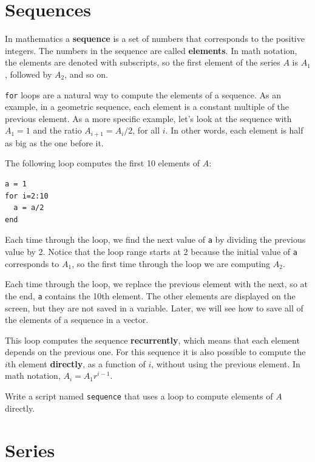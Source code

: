 \documentclass{book}
\begin{document}
\section{Sequences}

In mathematics a {\bf sequence} is a set of numbers that corresponds
to the positive integers. The numbers in the sequence are
called {\bf elements}. In math notation, the elements
are denoted with subscripts, so the first element of the series $A$ is
$A_1$, followed by $A_2$, and so on.

{\tt for} loops are a natural way to compute the elements of a sequence.
As an example, in a geometric sequence, each element is a constant
multiple of the previous element. As a more specific example, let's
look at the sequence with $A_1 = 1$ and the ratio $A_{i+1} = A_i/2$,
for all $i$. In other words, each element is half as big as the one
before it.

The following loop computes the first 10 elements of $A$:

\begin{verbatim}
a = 1
for i=2:10
  a = a/2
end
\end{verbatim}

Each time through the loop, we find the next value of {\tt a}
by dividing the previous value by 2. Notice that the loop
range starts at 2 because the initial value of {\tt a} corresponds
to $A_1$, so the first time through the loop we are computing
$A_2$.

Each time through the loop, we replace the previous element with
the next, so at the end, {\tt a} contains the 10th element. The
other elements are displayed on the screen, but they are not saved
in a variable. Later, we will see how to save all of the elements
of a sequence in a vector.

This loop computes the sequence {\bf recurrently}, which means
that each element depends on the previous one.
For this sequence it is also possible to compute the $i$th element
{\bf directly}, as a function of $i$, without using the previous element.
In math notation, $A_i = A_1 r^{i-1}$. 

\begin{ex}
Write a
script named {\tt sequence} that uses a loop
to compute elements of $A$ directly.
\end{ex}


\section{Series}
\label{series}
\end{document}

